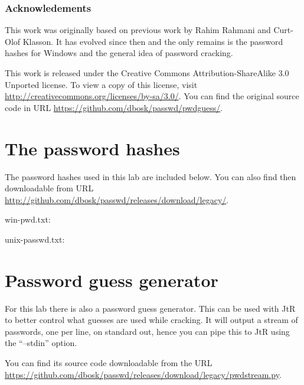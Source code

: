 \subsubsection*{Acknowledements}

This work was originally based on previous work by Rahim Rahmani and Curt-Olof 
Klasson.
It has evolved since then and the only remains is the password hashes for 
Windows and the general idea of password cracking.

This work is released under the Creative Commons Attribution-ShareAlike 3.0 
Unported license.
To view a copy of this license, visit 
\url{http://creativecommons.org/licenses/by-sa/3.0/}.
You can find the original source code in URL 
\url{https://github.com/dbosk/passwd/pwdguess/}.


\appendix
\section{The password hashes}
\label{sec:hashes}
The password hashes used in this lab are included below.
You can also find then downloadable from URL
\url{http://github.com/dbosk/passwd/releases/download/legacy/}.

win-pwd.txt:


unix-passwd.txt:



\section{Password guess generator}
\label{sec:pwdstream}
For this lab there is also a password guess generator.
This can be used with \ac{JtR} to better control what guesses are used while 
cracking.
It will output a stream of passwords, one per line, on standard out, hence you 
can pipe this to \ac{JtR} using the \enquote{--stdin} option.

You can find its source code downloadable from the URL
\url{https://github.com/dbosk/passwd/releases/download/legacy/pwdstream.py}.

%


\printbibliography
